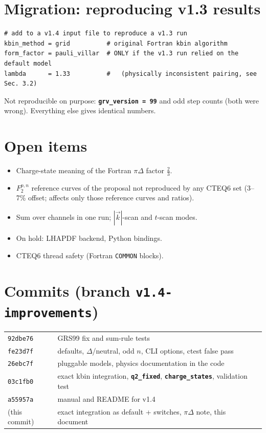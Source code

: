 \documentclass[11pt,a4paper]{article}
\newcommand{\key}[1]{\texttt{\textbf{#1}}}
\begin{document}
\section{Migration: reproducing v1.3 results}
\begin{lstlisting}
# add to a v1.4 input file to reproduce a v1.3 run
kbin_method = grid          # original Fortran kbin algorithm
form_factor = pauli_villar  # ONLY if the v1.3 run relied on the default model
lambda      = 1.33          #   (physically inconsistent pairing, see Sec. 3.2)
\end{lstlisting}
Not reproducible on purpose: \key{grv\_version = 99} and odd step counts
(both were wrong).  Everything else gives identical numbers.

\section{Open items}
\begin{itemize}
\item Charge-state meaning of the Fortran $\pi\Delta$ factor $\tfrac23$.
\item $F_2^{p,n}$ reference curves of the proposal not reproduced by any CTEQ6
  set (3--7\% offset; affects only those reference curves and ratios).
\item Sum over channels in one run; $|\vec k|$-scan and $t$-scan modes.
\item On hold: LHAPDF backend, Python bindings.
\item CTEQ6 thread safety (Fortran \texttt{COMMON} blocks).
\end{itemize}

\section*{Commits (branch \texttt{v1.4-improvements})}
\begin{tabular}{ll}
\texttt{92dbe76} & GRS99 fix and sum-rule tests \\
\texttt{fe23d7f} & defaults, $\Delta$/neutral, odd $n$, CLI options, ctest false pass \\
\texttt{26ebc7f} & pluggable models, physics documentation in the code \\
\texttt{03c1fb0} & exact kbin integration, \key{q2\_fixed}, \key{charge\_states}, validation test \\
\texttt{a55957a} & manual and README for v1.4 \\
(this commit) & exact integration as default + switches, $\pi\Delta$ note, this document
\end{tabular}
\end{document}
